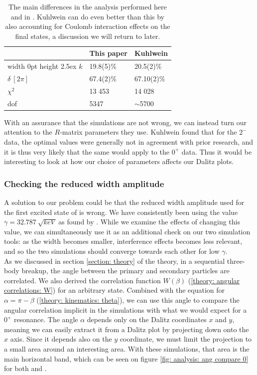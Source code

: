 \begin{table}[h]
	\begin{tabular}{l|p{}p{}}
		& This paper & Kuhlwein \cite{Kuhlwein} \\ \hline
		\vrule width 0pt height 2.5ex
		$k$ & 19.8(5)\% & 20.5(2)\% \\
		$\delta\ [2\pi]$ & 67.4(2)\% & 67.10(2)\% \\
		$\chi^2$ & 13 453 & 14 028 \\
		dof & 5347 & $\sim$5700
	\end{tabular}
	\caption{The main differences in the analysis performed here and in \cite{Kuhlwein}. Kuhlwein can do even better than this by also accounting for Coulomb interaction effects on the final states, a discussion we will return to later.}
	\label{table: analysis: dalitz: this and kuhlwein}
\end{table}

With an assurance that the simulations are not wrong, we can instead turn our attention to the $R$-matrix parameters they use. Kuhlwein found that for the $2^-$ data, the optimal values were generally not in agreement with prior research, and it is thus very likely that the same would apply to the $0^+$ data. Thus it would be interesting to look at how our choice of parameters affects our Dalitz plots.

\FloatBarrier

\subsubsection{Checking the reduced width amplitude}
A solution to our problem could be that the reduced width amplitude used for the first excited state of  is wrong. We have consistently been using the value $\gamma = \SI{32.787}{\sqrt{keV}}$ as found by \cite{Bhattacharya}. While we examine the effects of changing this value, we can simultaneously use it as an additional check on our two simulation tools: as the width becomes smaller, interference effects becomes less relevant, and so the two simulations should converge towards each other for low $\gamma$. \\

As we discussed in section \ref{section: theory} of the theory, in a sequential three-body breakup, the angle between the primary and secondary particles are correlated. We also derived the correlation function $W(\beta)$ (\ref{theory: angular correlations: W}) for an arbitrary state. Combined with the equation for $\alpha = \pi - \beta$ (\ref{theory: kinematics: theta}), we can use this angle to compare the angular correlation implicit in the simulations with what we would expect for a $0^+$ resonance. The angle $\alpha$ depends only on the Dalitz coordinates $x$ and $y$, meaning we can easily extract it from a Dalitz plot by projecting down onto the $x$ axis. Since it depends also on the $y$ coordinate, we must limit the projection to a small area around an interesting area. With these simulations, that area is the main horizontal band, which can be seen on figure \ref{fig: analysis: ang compare 0} for both \simta{} and \simX{}. \\

